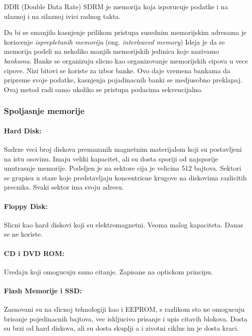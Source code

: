 \documentclass[12p,a4paper]{article}
\begin{document}
\begin{multicols}{2}
    DDR (Double Data Rate) SDRM je memorija koja isporucuje podatke i na
    ulaznoj i na silaznoj ivici radnog takta.
    
    Da bi se smanjilo kasnjenje prilikom pristupa susednim memorijskim adresama
    je koriscenje \emph{isprepletanih memorija} 
    (eng. \emph{interleaved memory})
    Ideja je da se memorija podeli na nekoliko manjih memorijskih jedinica 
    koje nazivamo \emph{bankama}. Banke se organizuju slicno kao organizovanje
    memorijskih cipova u vece cipove. Nizi bitovi se koriste za izbor banke.
    Ovo daje vremena bankama da pripreme svoje podatke, kasnjenja pojadinacnih
    banki se medjusobno preklapaj. Ovaj metod radi samo ukoliko se pristupa 
    podacima sekvencijalno.

    \subsubsection{Spoljasnje memorije}

    \paragraph{Hard Disk:} Sadrze veci broj diskova premazanih magnetnim 
    materijalom koji su postavljeni na istu osovinu. Imaju veliki kapacitet,
    ali su dosta sporiji od najsporije unutrasnje memorije. Podeljen je na
    sektore cija je velicina 512 bajtova. Sektori se grupisu u staze koje
    predstavljaju koncentricne krugove na diskovima razlicitih precnika.
    Svaki sektor ima svoju adresu.

    \paragraph{Floppy Disk:} Slicni kao hard diskovi koji su elektromagnetni.
    Veoma malog kapaciteta. Danas se ne koriste.

    \paragraph{CD i DVD ROM:} Uredaju koji omogucuju samo citanje. Zapisane
    na optickom principu.

    \paragraph{Flash Memorije i SSD:} Zasnovani su na slicnoj tehnologiji
    kao i EEPROM, s razlikom sto ne omogucuju brisanje pojedinacnih bajtova,
    vec iskljucivo prisanje i upis citavih blokova. Dosta su brzi od
    hard diskova, ali su dosta skuplji a i zivotni ciklus im je dosta kraci.


\end{multicols}
\end{document}
